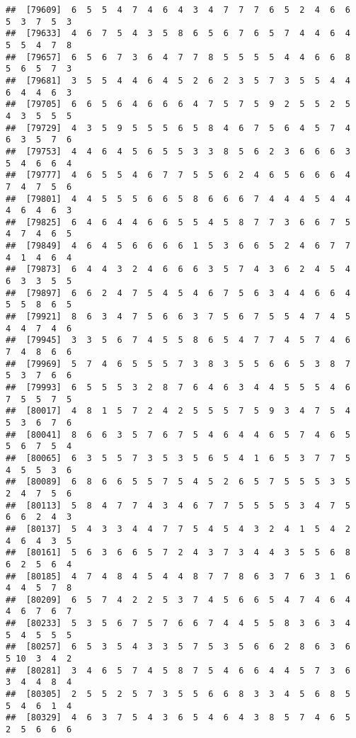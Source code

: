 \documentclass[
]{book}
\begin{document}
\begin{verbatim}
##  [79609]  6  5  5  4  7  4  6  4  3  4  7  7  7  6  5  2  4  6  6  5  3  7  5  3
##  [79633]  4  6  7  5  4  3  5  8  6  5  6  7  6  5  7  4  4  6  4  5  5  4  7  8
##  [79657]  6  5  6  7  3  6  4  7  7  8  5  5  5  5  4  4  6  6  8  5  6  5  7  3
##  [79681]  3  5  5  4  4  6  4  5  2  6  2  3  5  7  3  5  5  4  4  6  4  4  6  3
##  [79705]  6  6  5  6  4  6  6  6  4  7  5  7  5  9  2  5  5  2  5  4  3  5  5  5
##  [79729]  4  3  5  9  5  5  5  6  5  8  4  6  7  5  6  4  5  7  4  6  3  5  7  6
##  [79753]  4  4  6  4  5  6  5  5  3  3  8  5  6  2  3  6  6  6  3  5  4  6  6  4
##  [79777]  4  6  5  5  4  6  7  7  5  5  6  2  4  6  5  6  6  6  4  7  4  7  5  6
##  [79801]  4  4  5  5  5  6  6  5  8  6  6  6  7  4  4  4  5  4  4  4  6  4  6  3
##  [79825]  6  4  6  4  4  6  6  5  5  4  5  8  7  7  3  6  6  7  5  4  7  4  6  5
##  [79849]  4  6  4  5  6  6  6  6  1  5  3  6  6  5  2  4  6  7  7  4  1  4  6  4
##  [79873]  6  4  4  3  2  4  6  6  6  3  5  7  4  3  6  2  4  5  4  6  3  3  5  5
##  [79897]  6  6  2  4  7  5  4  5  4  6  7  5  6  3  4  4  6  6  4  5  5  8  6  5
##  [79921]  8  6  3  4  7  5  6  6  3  7  5  6  7  5  5  4  7  4  5  4  4  7  4  6
##  [79945]  3  3  5  6  7  4  5  5  8  6  5  4  7  7  4  5  7  4  6  7  4  8  6  6
##  [79969]  5  7  4  6  5  5  5  7  3  8  3  5  5  6  6  5  3  8  7  5  3  7  6  6
##  [79993]  6  5  5  5  3  2  8  7  6  4  6  3  4  4  5  5  5  4  6  7  5  5  7  5
##  [80017]  4  8  1  5  7  2  4  2  5  5  5  7  5  9  3  4  7  5  4  5  3  6  7  6
##  [80041]  8  6  6  3  5  7  6  7  5  4  6  4  4  6  5  7  4  6  5  5  6  7  5  4
##  [80065]  6  3  5  5  7  3  5  3  5  6  5  4  1  6  5  3  7  7  5  4  5  5  3  6
##  [80089]  6  8  6  6  5  5  7  5  4  5  2  6  5  7  5  5  5  3  5  2  4  7  5  6
##  [80113]  5  8  4  7  7  4  3  4  6  7  7  5  5  5  5  3  4  7  5  6  6  2  4  3
##  [80137]  5  4  3  3  4  4  7  7  5  4  5  4  3  2  4  1  5  4  2  4  6  4  3  5
##  [80161]  5  6  3  6  6  5  7  2  4  3  7  3  4  4  3  5  5  6  8  6  2  5  6  4
##  [80185]  4  7  4  8  4  5  4  4  8  7  7  8  6  3  7  6  3  1  6  4  4  5  7  8
##  [80209]  6  5  7  4  2  2  5  3  7  4  5  6  6  5  4  7  4  6  4  4  6  7  6  7
##  [80233]  5  3  5  6  7  5  7  6  6  7  4  4  5  5  8  3  6  3  4  5  4  5  5  5
##  [80257]  6  5  3  5  4  3  3  5  7  5  3  5  6  6  2  8  6  3  6  5 10  3  4  2
##  [80281]  3  4  6  5  7  4  5  8  7  5  4  6  6  4  4  5  7  3  6  3  4  4  8  4
##  [80305]  2  5  5  2  5  7  3  5  5  6  6  8  3  3  4  5  6  8  5  5  4  6  1  4
##  [80329]  4  6  3  7  5  4  3  6  5  4  6  4  3  8  5  7  4  6  5  2  5  6  6  6

\end{verbatim}
\end{document}
